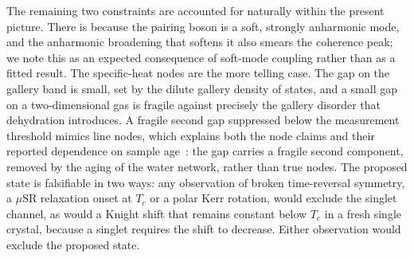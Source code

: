 \documentclass[aps,10pt,preprint,superscriptaddress,floatfix]{revtex4-2}
\begin{document}
The remaining two constraints are accounted for naturally within the present picture. There is  because the pairing boson is a soft, strongly anharmonic mode, and the
anharmonic broadening that softens it also smears the coherence peak; we note this as an expected
consequence of soft-mode coupling rather than as a fitted result. The specific-heat nodes are the more telling case. The
gap on the gallery band is small, set by the dilute gallery density of states, and a small gap on a
two-dimensional gas is fragile against precisely the gallery disorder that dehydration introduces. A
fragile second gap suppressed below the measurement threshold mimics line nodes, which explains
both the node claims and their reported dependence on sample age~\cite{Sakurai2015}: the gap
carries a fragile second component, removed by the aging of the water network, rather than true
nodes. The proposed state is falsifiable in two ways: any observation of broken time-reversal
symmetry, a $\mu$SR relaxation onset at $T_c$ or a polar Kerr rotation, would exclude the singlet
channel, as would a Knight shift that remains constant below $T_c$ in a fresh single crystal,
because a singlet requires the shift to decrease. Either observation would exclude the proposed
state.
\end{document}
